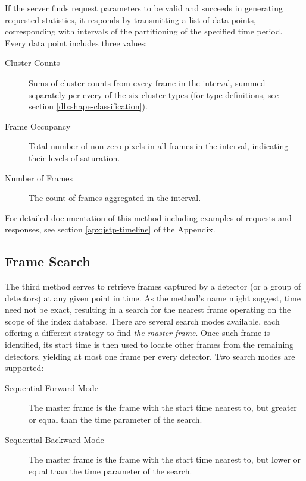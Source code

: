 If the server finds request parameters to be valid and succeeds in generating requested statistics, it responds by transmitting a list of data points, corresponding with intervals of the partitioning of the specified time period. Every data point includes three values:

\begin{description}
	\item[Cluster Counts]
	Sums of cluster counts from every frame in the interval, summed separately per every of the six cluster types (for type definitions, see section \ref{db:shape-classification}).

	\item[Frame Occupancy]
	Total number of non-zero pixels in all frames in the interval, indicating their levels of saturation.

	\item[Number of Frames]
	The count of frames aggregated in the interval.
\end{description}

For detailed documentation of this method including examples of requests and responses, see section \ref{apx:jstp-timeline} of the Appendix.

\subsection{Frame Search}
The third method serves to retrieve frames captured by a detector (or a group of detectors) at any given point in time. As the method's name might suggest, time need not be exact, resulting in a search for the nearest frame operating on the scope of the index database. There are several search modes available, each offering a different strategy to find \textit{the master frame}. Once such frame is identified, its start time is then used to locate other frames from the remaining detectors, yielding at most one frame per every detector. Two search modes are supported:

\begin{description}
	\item[Sequential Forward Mode]
	The master frame is the frame with the start time nearest to, but greater or equal than the time parameter of the search.

	\item[Sequential Backward Mode]
	The master frame is the frame with the start time nearest to, but lower or equal than the time parameter of the search.

\end{description}

